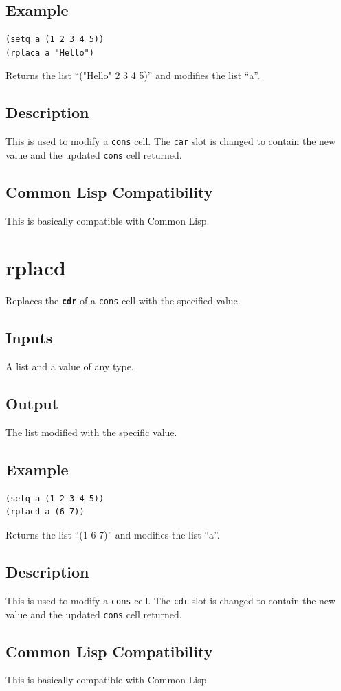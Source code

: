 \documentclass[10pt, openany]{book}
\newcommand{\operation}[1]{\textbf{\texttt{#1}}}
\newcommand{\keyword}[1]{\texttt{#1}}
\newcommand{\datatype}[1]{\texttt{#1}}
\newcommand{\cl}{Common Lisp}
\begin{document}
\subsection{Example}
\begin{lstlisting}
(setq a (1 2 3 4 5))
(rplaca a "Hello")
\end{lstlisting}
Returns the list ``("Hello" 2 3 4 5)'' and modifies the list ``a''.
\subsection{Description}
This is used to modify a \datatype{cons} cell.  The \keyword{car} slot is changed to contain the new value and the updated \datatype{cons} cell returned.
\subsection{Common Lisp Compatibility}
This is basically compatible with \cl.

\section{rplacd}
Replaces the \operation{cdr} of a \datatype{cons} cell with the specified value.
\subsection{Inputs}
A list and a value of any type.
\subsection{Output}
The list modified with the specific value.
\subsection{Example}
\begin{lstlisting}
(setq a (1 2 3 4 5))
(rplacd a (6 7))
\end{lstlisting}
Returns the list ``(1 6 7)'' and modifies the list ``a''.
\subsection{Description}
This is used to modify a \datatype{cons} cell.  The \keyword{cdr} slot is changed to contain the new value and the updated \datatype{cons} cell returned.
\subsection{Common Lisp Compatibility}
This is basically compatible with \cl.
\end{document}
